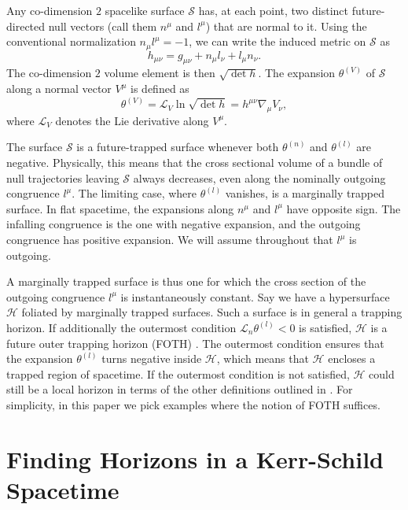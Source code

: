 Any co-dimension $2$ spacelike surface $\mathcal{S}$  has, at each point, two distinct future-directed null vectors
(call them $n^{\mu}$ and $l^{\mu}$) that are normal to it. Using the conventional normalization $n_{\mu} l^{\mu} =
-1$, we can write the induced metric on $\mathcal{S}$ as
\begin{equation}
    h_{\mu \nu} = g_{\mu \nu} + n_\mu l_\nu + l_\mu n_\nu.
\end{equation}
The co-dimension $2$ volume element is then $\sqrt{\det h}$. The expansion $\theta^{(V)}$ of $\mathcal{S}$ along a normal vector $V^\mu$ is defined as
\begin{equation} \label{Horizons:expansionDefn}
    \theta^{(V)} = \mathcal{L}_V \ln \sqrt{\det h} = h^{\mu \nu} \nabla_\mu V_\nu,
\end{equation}
where $\mathcal{L}_V$ denotes the Lie derivative along $V^\mu$.

The surface $\mathcal{S}$ is a future-trapped surface whenever both $\theta^{(n)}$ and $\theta^{(l)}$ are negative.
Physically, this means that the cross sectional volume of a bundle of null trajectories leaving $\mathcal{S}$
always decreases, even along the nominally outgoing congruence $l^\mu$. The limiting case, where $\theta^{(l)}$
vanishes, is a marginally trapped surface.  In flat spacetime, the expansions along $n^\mu$ and $l^\mu$ have
opposite sign. The infalling congruence is the one with negative expansion, and the outgoing congruence has
positive expansion. We will assume throughout that $l^\mu$ is outgoing. 

A marginally trapped surface is thus one for which the cross section of the outgoing congruence $l^{\mu}$ is
instantaneously constant. Say we have a hypersurface $\mathcal{H}$ foliated by marginally trapped surfaces. Such a
surface is in general a trapping horizon. If
additionally the outermost condition $\mathcal{L}_{n} \theta^{(l)} < 0$ is satisfied, $\mathcal{H}$ is a
future outer trapping horizon (FOTH) \cite{Hayward:1993wb}. The outermost condition ensures that the expansion
$\theta^{(l)}$ turns negative inside $\mathcal{H}$, which means that $\mathcal{H}$ encloses a trapped region of
spacetime. If the outermost condition is not satisfied, $\mathcal{H}$ could still be a local horizon in terms of
the other definitions outlined in \cite{Gourgoulhon:2008pu}. For simplicity, in this paper we pick examples where
the notion of FOTH suffices.

\section{Finding Horizons in a Kerr-Schild Spacetime} \label{Horizons:sec:setup}

